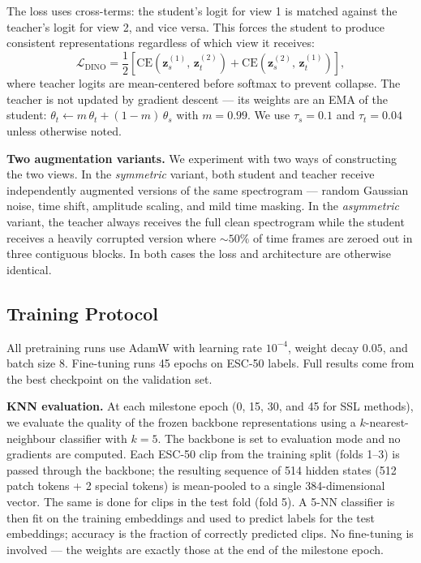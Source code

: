 \documentclass{article}
\begin{document}
The loss uses cross-terms: the student's logit for view 1 is matched against the teacher's logit for view 2, and vice versa. This forces the student to produce consistent representations regardless of which view it receives:
\[
    \mathcal{L}_\text{DINO} = \frac{1}{2}\!\left[\text{CE}(\mathbf{z}_s^{(1)},\, \mathbf{z}_t^{(2)}) + \text{CE}(\mathbf{z}_s^{(2)},\, \mathbf{z}_t^{(1)})\right],
\]
where teacher logits are mean-centered before softmax to prevent collapse. The teacher is not updated by gradient descent — its weights are an EMA of the student: $\theta_t \leftarrow m\,\theta_t + (1{-}m)\,\theta_s$ with $m{=}0.99$. We use $\tau_s{=}0.1$ and $\tau_t{=}0.04$ unless otherwise noted.

\noindent\textbf{Two augmentation variants.}
We experiment with two ways of constructing the two views. In the \emph{symmetric} variant, both student and teacher receive independently augmented versions of the same spectrogram — random Gaussian noise, time shift, amplitude scaling, and mild time masking. In the \emph{asymmetric} variant, the teacher always receives the full clean spectrogram while the student receives a heavily corrupted version where ${\sim}50\%$ of time frames are zeroed out in three contiguous blocks. In both cases the loss and architecture are otherwise identical.

\subsection{Training Protocol}

All pretraining runs use AdamW with learning rate $10^{-4}$, weight decay $0.05$, and batch size 8. Fine-tuning runs 45 epochs on ESC-50 labels. Full results come from the best checkpoint on the validation set.

\noindent\textbf{KNN evaluation.}
At each milestone epoch (0, 15, 30, and 45 for SSL methods), we evaluate the quality of the frozen backbone representations using a $k$-nearest-neighbour classifier with $k{=}5$. The backbone is set to evaluation mode and no gradients are computed. Each ESC-50 clip from the training split (folds 1--3) is passed through the backbone; the resulting sequence of 514 hidden states (512 patch tokens + 2 special tokens) is mean-pooled to a single 384-dimensional vector. The same is done for clips in the test fold (fold 5). A 5-NN classifier is then fit on the training embeddings and used to predict labels for the test embeddings; accuracy is the fraction of correctly predicted clips. No fine-tuning is involved — the weights are exactly those at the end of the milestone epoch.
\end{document}

